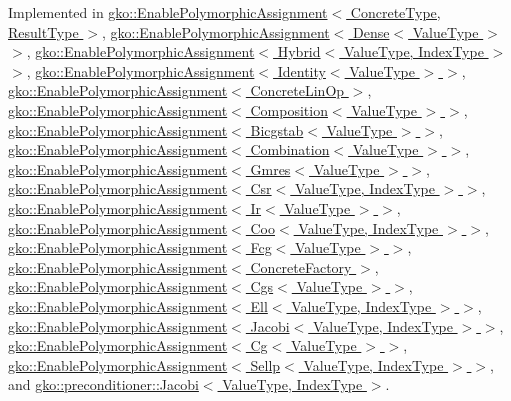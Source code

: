 Implemented in \hyperlink{classgko_1_1EnablePolymorphicAssignment_a6b7e6872e96084636f8ab5091063ada8}{gko\+::\+Enable\+Polymorphic\+Assignment$<$ Concrete\+Type, Result\+Type $>$}, \hyperlink{classgko_1_1EnablePolymorphicAssignment_a6b7e6872e96084636f8ab5091063ada8}{gko\+::\+Enable\+Polymorphic\+Assignment$<$ Dense$<$ Value\+Type $>$ $>$}, \hyperlink{classgko_1_1EnablePolymorphicAssignment_a6b7e6872e96084636f8ab5091063ada8}{gko\+::\+Enable\+Polymorphic\+Assignment$<$ Hybrid$<$ Value\+Type, Index\+Type $>$ $>$}, \hyperlink{classgko_1_1EnablePolymorphicAssignment_a6b7e6872e96084636f8ab5091063ada8}{gko\+::\+Enable\+Polymorphic\+Assignment$<$ Identity$<$ Value\+Type $>$ $>$}, \hyperlink{classgko_1_1EnablePolymorphicAssignment_a6b7e6872e96084636f8ab5091063ada8}{gko\+::\+Enable\+Polymorphic\+Assignment$<$ Concrete\+Lin\+Op $>$}, \hyperlink{classgko_1_1EnablePolymorphicAssignment_a6b7e6872e96084636f8ab5091063ada8}{gko\+::\+Enable\+Polymorphic\+Assignment$<$ Composition$<$ Value\+Type $>$ $>$}, \hyperlink{classgko_1_1EnablePolymorphicAssignment_a6b7e6872e96084636f8ab5091063ada8}{gko\+::\+Enable\+Polymorphic\+Assignment$<$ Bicgstab$<$ Value\+Type $>$ $>$}, \hyperlink{classgko_1_1EnablePolymorphicAssignment_a6b7e6872e96084636f8ab5091063ada8}{gko\+::\+Enable\+Polymorphic\+Assignment$<$ Combination$<$ Value\+Type $>$ $>$}, \hyperlink{classgko_1_1EnablePolymorphicAssignment_a6b7e6872e96084636f8ab5091063ada8}{gko\+::\+Enable\+Polymorphic\+Assignment$<$ Gmres$<$ Value\+Type $>$ $>$}, \hyperlink{classgko_1_1EnablePolymorphicAssignment_a6b7e6872e96084636f8ab5091063ada8}{gko\+::\+Enable\+Polymorphic\+Assignment$<$ Csr$<$ Value\+Type, Index\+Type $>$ $>$}, \hyperlink{classgko_1_1EnablePolymorphicAssignment_a6b7e6872e96084636f8ab5091063ada8}{gko\+::\+Enable\+Polymorphic\+Assignment$<$ Ir$<$ Value\+Type $>$ $>$}, \hyperlink{classgko_1_1EnablePolymorphicAssignment_a6b7e6872e96084636f8ab5091063ada8}{gko\+::\+Enable\+Polymorphic\+Assignment$<$ Coo$<$ Value\+Type, Index\+Type $>$ $>$}, \hyperlink{classgko_1_1EnablePolymorphicAssignment_a6b7e6872e96084636f8ab5091063ada8}{gko\+::\+Enable\+Polymorphic\+Assignment$<$ Fcg$<$ Value\+Type $>$ $>$}, \hyperlink{classgko_1_1EnablePolymorphicAssignment_a6b7e6872e96084636f8ab5091063ada8}{gko\+::\+Enable\+Polymorphic\+Assignment$<$ Concrete\+Factory $>$}, \hyperlink{classgko_1_1EnablePolymorphicAssignment_a6b7e6872e96084636f8ab5091063ada8}{gko\+::\+Enable\+Polymorphic\+Assignment$<$ Cgs$<$ Value\+Type $>$ $>$}, \hyperlink{classgko_1_1EnablePolymorphicAssignment_a6b7e6872e96084636f8ab5091063ada8}{gko\+::\+Enable\+Polymorphic\+Assignment$<$ Ell$<$ Value\+Type, Index\+Type $>$ $>$}, \hyperlink{classgko_1_1EnablePolymorphicAssignment_a6b7e6872e96084636f8ab5091063ada8}{gko\+::\+Enable\+Polymorphic\+Assignment$<$ Jacobi$<$ Value\+Type, Index\+Type $>$ $>$}, \hyperlink{classgko_1_1EnablePolymorphicAssignment_a6b7e6872e96084636f8ab5091063ada8}{gko\+::\+Enable\+Polymorphic\+Assignment$<$ Cg$<$ Value\+Type $>$ $>$}, \hyperlink{classgko_1_1EnablePolymorphicAssignment_a6b7e6872e96084636f8ab5091063ada8}{gko\+::\+Enable\+Polymorphic\+Assignment$<$ Sellp$<$ Value\+Type, Index\+Type $>$ $>$}, and \hyperlink{classgko_1_1preconditioner_1_1Jacobi_a54ce952ac4a12c3f4686442375cd4dc8}{gko\+::preconditioner\+::\+Jacobi$<$ Value\+Type, Index\+Type $>$}.

